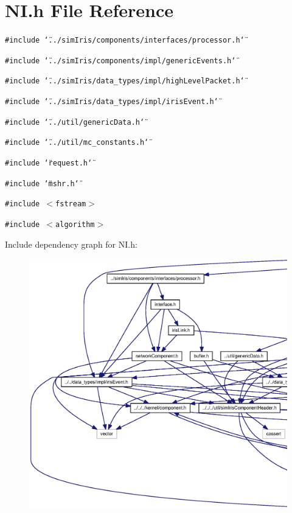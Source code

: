 \section{NI.h File Reference}
\label{NI_8h}
{\tt \#include \char`\"{}../simIris/components/interfaces/processor.h\char`\"{}}\par
{\tt \#include \char`\"{}../simIris/components/impl/genericEvents.h\char`\"{}}\par
{\tt \#include \char`\"{}../simIris/data\_\-types/impl/highLevelPacket.h\char`\"{}}\par
{\tt \#include \char`\"{}../simIris/data\_\-types/impl/irisEvent.h\char`\"{}}\par
{\tt \#include \char`\"{}../util/genericData.h\char`\"{}}\par
{\tt \#include \char`\"{}../util/mc\_\-constants.h\char`\"{}}\par
{\tt \#include \char`\"{}request.h\char`\"{}}\par
{\tt \#include \char`\"{}mshr.h\char`\"{}}\par
{\tt \#include $<$fstream$>$}\par
{\tt \#include $<$algorithm$>$}\par


Include dependency graph for NI.h:\nopagebreak
\begin{figure}[H]
\begin{center}
\leavevmode
\includegraphics[width=420pt]{NI_8h__incl}
\end{center}
\end{figure}


